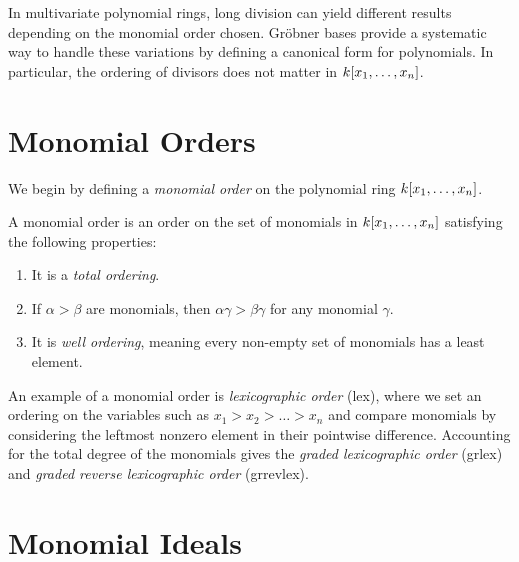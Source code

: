 \documentclass[twoside]{article}
\begin{document}



In multivariate polynomial rings, long division can yield different results
depending on the monomial order chosen. Gr\"{o}bner bases provide a systematic
way to handle these variations by defining a canonical form for polynomials. In
particular, the ordering of divisors does not matter in \(k[x_1, \ldots,
x_n]\).

\section{Monomial Orders}
\label{sec:monomial-orders}

We begin by defining a \emph{monomial order} on the polynomial ring
\(k[x_1, \ldots, x_n]\).

\begin{definition}
    A monomial order is an order on the set of monomials in \(k[x_1,
    \ldots, x_n]\) satisfying the following properties:
    \begin{enumerate}
        \item It is a \emph{total ordering}.
        \item If \(\alpha > \beta\) are monomials, then \(\alpha\gamma >
        \beta\gamma\) for any monomial \(\gamma\).
        \item It is \emph{well ordering}, meaning every non-empty set of
        monomials has a least element.
    \end{enumerate}
\end{definition}

An example of a monomial order is \emph{lexicographic order} (lex), where we set
an ordering on the variables such as \(x_1 > x_2 > \ldots > x_n\) and compare
monomials by considering the leftmost nonzero element in their pointwise
difference. Accounting for the total degree of the monomials gives the
\emph{graded lexicographic order} (grlex) and \emph{graded reverse lexicographic
order} (grrevlex).

\section{Monomial Ideals}
\label{sec:monomial-ideals}
\end{document}
